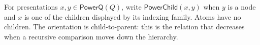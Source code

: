 \begin{definition}
For presentations $x,y\in\mathsf{PowerQ}(Q)$, write
$\mathsf{PowerChild}(x,y)$ when $y$ is a node and $x$ is one of the
children displayed by its indexing family.  Atoms have no children.  The
orientation is child-to-parent: this is the relation that decreases when a
recursive comparison moves down the hierarchy.
\end{definition}
